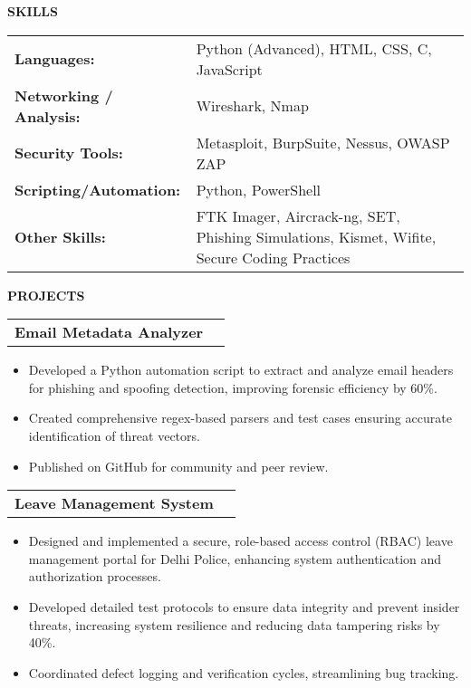 \documentclass[a4paper]{article}
\begin{document}
\begin{sectionbox}\textbf{SKILLS}\end{sectionbox} 
\vspace{0em} 
\begin{tabularx}{\textwidth}{@{}>{\bfseries}l X@{}} 
Languages: & Python (Advanced), HTML, CSS, C, JavaScript \\ 
Networking / Analysis: & Wireshark, Nmap \\ 
Security Tools: & Metasploit, BurpSuite, Nessus, OWASP ZAP \\ 
Scripting/Automation: & Python, PowerShell \\ 
Other Skills: & FTK Imager, Aircrack-ng, SET, Phishing Simulations, Kismet, Wifite, Secure Coding Practices \\ 
\end{tabularx} 
\begin{sectionbox}\textbf{PROJECTS}\end{sectionbox} 
\vspace{0em} 
\begin{tabularx}{\textwidth}{@{}X r@{}} 
\textbf{Email Metadata Analyzer} & 
\end{tabularx} 
\vspace{-0.2em} 
\begin{itemize} 
\item Developed a Python automation script to extract and analyze email headers for phishing and spoofing detection, improving forensic efficiency by 60\%. 
\item Created comprehensive regex-based parsers and test cases ensuring accurate identification of threat vectors. 
\item Published on GitHub for community and peer review. 
\end{itemize} 
\vspace{0.4em} 
\begin{tabularx}{\textwidth}{@{}X r@{}} 
\textbf{Leave Management System} & 
\end{tabularx} 
\vspace{-0.2em} 
\begin{itemize} 
\item Designed and implemented a secure, role-based access control (RBAC) leave management portal for Delhi Police, enhancing system authentication and authorization processes. 
\item Developed detailed test protocols to ensure data integrity and prevent insider threats, increasing system resilience and reducing data tampering risks by 40\%. 
\item Coordinated defect logging and verification cycles, streamlining bug tracking. 
\end{itemize} 
\end{document}
